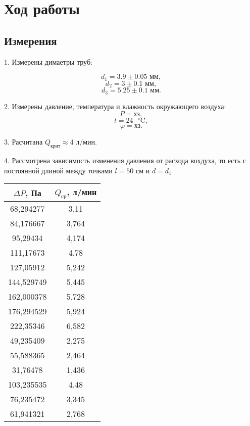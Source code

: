 \section{Ход работы}
\subsection{Измерения}
1. Измерены димаетры труб:

\[d_1 = 3.9 \pm 0.05 \text{ мм},\]
\[d_2 = 3 \pm 0.1 \text{ мм},\]
\[d_3 = 5.25 \pm 0.1 \text{ мм}.\]

2. Измерены давление, температура и влажность окружающего воздуха:
\[P = \text{хз},\]
\[t = 24\text{ }^\circ \text{C},\]
\[\varphi = \text{хз}.\]

3. Расчитана $Q_\text{крит} \approx 4 \text{ л/мин}$.

4. Рассмотрена зависимость изменения давления от расхода вохдуха, то есть с постоянной длиной между точками $l = 50$ см и $d = d_1$
\begin{center}
\begin{tabular}[h]{|c|c|}
   \hline
    $\Delta P$, Па & $Q_\text{ср}$, л/мин\\
   \hline
   68,294277 & 3,11 \\
   \hline
   84,176667 & 3,764 \\
   \hline
   95,29434 & 4,174 \\
   \hline
   111,17673 & 4,78 \\
   \hline
   127,05912 & 5,242 \\
   \hline
   144,529749 & 5,445 \\
   \hline
   162,000378 & 5,728 \\
   \hline
   176,294529 & 5,924 \\
   \hline
   222,35346 & 6,582 \\
   \hline
   49,235409 & 2,275 \\
   \hline
   55,588365 & 2,464 \\
   \hline
   31,76478 & 1,436 \\
   \hline
   103,235535 & 4,48 \\
   \hline
   76,235472 & 3,345 \\
   \hline
   61,941321 & 2,768 \\
   \hline
\end{tabular}
\end{center}

